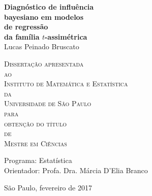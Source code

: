 \documentclass[12pt,twoside,a4paper]{book}
\begin{document}
\frontmatter 
\fancyhead[RO]{{\footnotesize\rightmark}\hspace{2em}\thepage}
\setcounter{tocdepth}{2}
\fancyhead[LE]{\thepage\hspace{2em}\footnotesize{\leftmark}}
\fancyhead[RE,LO]{}
\fancyhead[RO]{{\footnotesize\rightmark}\hspace{2em}\thepage}

\onehalfspacing  %

\thispagestyle{empty}
\begin{center}
    \vspace*{2.3cm}
    \Large{\textbf{Diagnóstico de influência\\
    bayesiano em modelos\\
    de regressão \\
    da família $t$-assimétrica}}\\
    
    \vspace*{1.2cm}
    \Large{Lucas Peinado Bruscato}
    
    \vskip 2cm
    \textsc{
    Dissertação apresentada\\[-0.25cm] 
    ao\\[-0.25cm]
    Instituto de Matemática e Estatística\\[-0.25cm]
    da\\[-0.25cm]
    Universidade de São Paulo\\[-0.25cm]
    para\\[-0.25cm]
    obtenção do título\\[-0.25cm]
    de\\[-0.25cm]
    Mestre em Ciências}
    
    \vskip 1.5cm
    Programa: Estatística\\
    Orientador: Profa. Dra. Márcia D'Elia Branco

   	\vskip 1cm
    \normalsize{}
    
    \vskip 0.5cm
    \normalsize{São Paulo, fevereiro de 2017}
\end{center}
\end{document}
